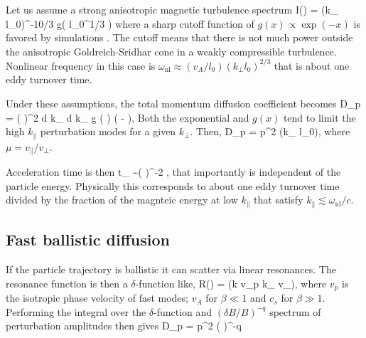 \documentclass{aa}
\begin{document}
Let us assume a strong anisotropic magnetic turbulence spectrum 
\be
I() =  (k_{\perp} l_0)^{-10/3} g\left(  l_0^{1/3} \right)
\ee
where a sharp cutoff function of $g(x) \propto \exp(-x)$ is favored by simulations \citep{Cho_2002}.
The cutoff means that there is not much power outside the anisotropic Goldreich-Sridhar cone \citep{Goldreich_1995} in a weakly compressible turbulence.
Nonlinear frequency in this case is $\omega_{\mathrm{nl}} \approx (v_A/l_0) ( k_{\perp} l_0)^{2/3}$ that is about one eddy turnover time.

Under these assumptions, the total momentum diffusion coefficient becomes
\be
D_p =   \left(  \right)^2 
\int d k_{\parallel} d k_{\perp}  g \left(  \right) 
\exp\left( - \right),
\ee
Both the exponential and $g(x)$ tend to limit the high $k_{\parallel}$ perturbation modes for a given $k_{\perp}$.
Then,
\be
D_p = p^2     \log(k_{} l_0),
\ee
where $\mu = v_{\parallel}/v_{\perp}$.

Acceleration time is then
\be
t_{} \sim \left(  \right)^{-2}  ,
\ee
that importantly is independent of the particle energy.
Physically this corresponds to about one eddy turnover time divided by the fraction of the magnteic energy at low $k_{\parallel}$ that satisfy $k_{\parallel} \lesssim \omega_{\mathrm{nl}}/c$.


\subsection{Fast ballistic diffusion}

If the particle trajectory is ballistic it can scatter via linear resonances.
The resonance function is then a $\delta$-function like,
\be
R() = \pi \delta(k v_p \pm k_{\parallel} v_{\parallel}),
\ee
where $v_p$ is the isotropic phase velocity of fast modes; 
$v_A$ for $\beta \ll 1$ and $c_s$ for $\beta \gg 1$.
Performing the integral over the $\delta$-function and $(\delta B/B)^{-q}$ spectrum of perturbation amplitudes then gives
\be
D_p = p^2  \left(  \right)^{-q}
\ee
\end{document}
